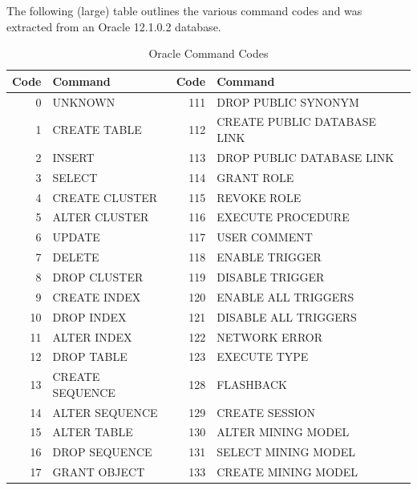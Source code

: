 \begin{appendix}
The following (large) table outlines the various command codes and was extracted
from an Oracle 12.1.0.2 database.

\begin{longtable}[]{@{}rl|rl@{}}
\toprule
Code & Command & Code & Command  \\
\midrule
\endhead
\bottomrule
\caption{Oracle Command Codes\ldots{}\textit{continues on next page}}
\endfoot
\caption{Oracle Command Codes}
\endlastfoot

0    & UNKNOWN                      & 111 & DROP PUBLIC SYNONYM          \\
1    & CREATE TABLE                 & 112 & CREATE PUBLIC DATABASE LINK  \\
2    & INSERT                       & 113 & DROP PUBLIC DATABASE LINK    \\
3    & SELECT                       & 114 & GRANT ROLE                   \\
4    & CREATE CLUSTER               & 115 & REVOKE ROLE                  \\      
5    & ALTER CLUSTER                & 116 & EXECUTE PROCEDURE            \\
6    & UPDATE                       & 117 & USER COMMENT                 \\
7    & DELETE                       & 118 & ENABLE TRIGGER               \\
8    & DROP CLUSTER                 & 119 & DISABLE TRIGGER              \\
9    & CREATE INDEX                 & 120 & ENABLE ALL TRIGGERS          \\
10   & DROP INDEX                   & 121 & DISABLE ALL TRIGGERS         \\
11   & ALTER INDEX                  & 122 & NETWORK ERROR                \\
12   & DROP TABLE                   & 123 & EXECUTE TYPE                 \\
13   & CREATE SEQUENCE              & 128 & FLASHBACK                    \\
14   & ALTER SEQUENCE               & 129 & CREATE SESSION               \\
15   & ALTER TABLE                  & 130 & ALTER MINING MODEL           \\
16   & DROP SEQUENCE                & 131 & SELECT MINING MODEL          \\
17   & GRANT OBJECT                 & 133 & CREATE MINING MODEL          \\

\end{longtable}
\end{appendix}
